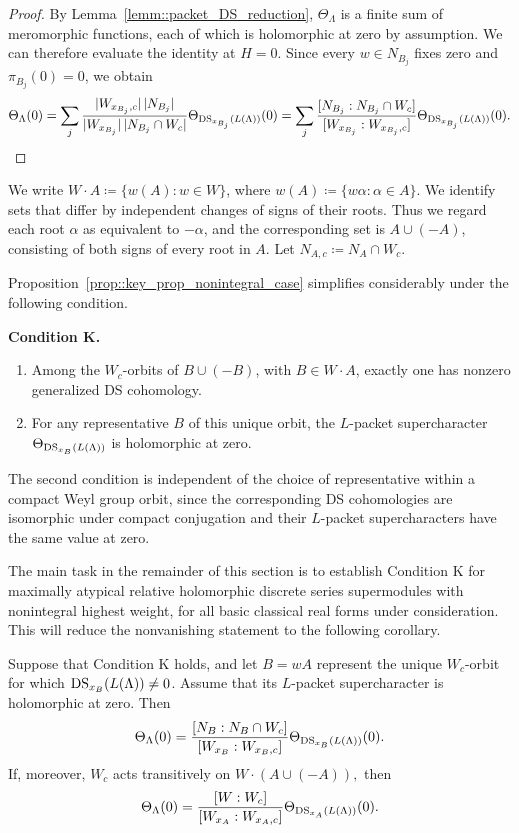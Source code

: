 \begin{proof}
By Lemma~\ref{lemm::packet_DS_reduction}, $\Theta_\Lambda$ is a finite sum of meromorphic functions, each of which is holomorphic at zero by assumption. We can therefore evaluate the identity at $H=0$. Since every $w\in N_{B_j}$ fixes zero and $\pi_{B_j}(0)=0$, we obtain
\[
\Theta_\Lambda(0)
=
\sum_j
\frac{|W_{x_{B_j},c}|\,|N_{B_j}|}
{|W_{x_{B_j}}|\,|N_{B_j}\cap W_c|}
\Theta_{\operatorname{DS}_{x_{B_j}}(L(\Lambda))}(0)=\sum_j
\frac{[N_{B_j}:N_{B_j}\cap W_c]}
{[W_{x_{B_j}}:W_{x_{B_j},c}]}
\Theta_{\operatorname{DS}_{x_{B_j}}(L(\Lambda))}(0).
\]
\end{proof}


We write
$
W\cdot A\coloneqq\{w(A):w\in W\}$, where $w(A)\coloneqq\{w\alpha:\alpha\in A\}.
$
We identify sets that differ by independent changes of signs of their roots.
Thus we regard each root $\alpha$ as equivalent to $-\alpha$, and the
corresponding set is $A\cup(-A)$, consisting of both signs of every root in $A$. Let
$
N_{A,c}\coloneqq N_A\cap W_c.
$

Proposition~\ref{prop::key_prop_nonintegral_case} simplifies
considerably under the following condition.

\medskip
\noindent\textbf{Condition K.}
\begin{enumerate}
    \item[(i)]
    Among the $W_c$-orbits of $B\cup(-B)$, with
    $B\in W\cdot A$, exactly one has nonzero generalized DS cohomology.

    \item[(ii)]
    For any representative $B$ of this unique orbit, the $L$-packet
    supercharacter $\Theta_{\operatorname{DS}_{x_B}(L(\Lambda))}$ is holomorphic at zero.
\end{enumerate}


The second condition is independent of the choice of representative within a compact Weyl group orbit, since the corresponding DS cohomologies are isomorphic under compact conjugation and their $L$-packet supercharacters have the same value at zero.


The main task in the remainder of this section is to establish
Condition K for maximally atypical relative holomorphic discrete
series supermodules with nonintegral highest weight, for all basic
classical real forms under consideration. This will reduce the nonvanishing statement to the following corollary.


\begin{corollary}
\label{cor::toral_nonvanishing}
Suppose that Condition K holds, and let $B=wA$ represent the unique $W_c$-orbit for which $\operatorname{DS}_{x_B}(L(\Lambda))\neq0$. Assume that its $L$-packet supercharacter is holomorphic at zero. Then
\begin{equation*}
\Theta_\Lambda(0)
=
\frac{[N_B:N_B\cap W_c]}
     {[W_{x_B}:W_{x_B,c}]}
\Theta_{\operatorname{DS}_{x_B}(L(\Lambda))}(0).
\end{equation*}
If, moreover, $W_c$ acts transitively on
$
W\cdot(A\cup(-A)),
$
then
\[
\Theta_\Lambda(0)
=
\frac{[W:W_c]}
     {[W_{x_A}:W_{x_A,c}]}
\Theta_{\operatorname{DS}_{x_A}(L(\Lambda))}(0).
\]
\end{corollary}




